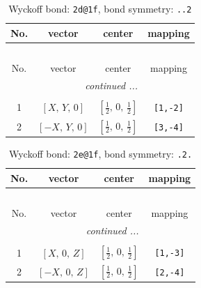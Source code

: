 \documentclass[fleqn,8pt]{jsarticle}
\begin{document}
\begin{longtable}{cccc}
\caption{Wyckoff bond: {\tt 2d@1f}, bond symmetry: {\tt ..2}}
 \\
 \hline \hline
No. & vector & center & mapping \\ \hline \endfirsthead

\multicolumn{3}{l}{\tablename\ \thetable{}} \\
 \hline \hline
No. & vector & center & mapping \\ \hline \endhead

 \hline \hline
\multicolumn{3}{r}{\footnotesize\it continued ...} \\ \endfoot

 \hline \hline
\multicolumn{3}{r}{} \\ \endlastfoot

1 & $\left[ X,\, Y,\, 0 \right]$ & $\left[ \frac{1}{2},\, 0,\, \frac{1}{2} \right]$ & {\tt [1,-2]} \\ \hline
2 & $\left[ - X,\, Y,\, 0 \right]$ & $\left[ \frac{1}{2},\, 0,\, \frac{1}{2} \right]$ & {\tt [3,-4]} \\
\end{longtable}
\renewcommand{\arraystretch}{1.2}
\begin{longtable}{cccc}
\caption{Wyckoff bond: {\tt 2e@1f}, bond symmetry: {\tt .2.}}
 \\
 \hline \hline
No. & vector & center & mapping \\ \hline \endfirsthead

\multicolumn{3}{l}{\tablename\ \thetable{}} \\
 \hline \hline
No. & vector & center & mapping \\ \hline \endhead

 \hline \hline
\multicolumn{3}{r}{\footnotesize\it continued ...} \\ \endfoot

 \hline \hline
\multicolumn{3}{r}{} \\ \endlastfoot

1 & $\left[ X,\, 0,\, Z \right]$ & $\left[ \frac{1}{2},\, 0,\, \frac{1}{2} \right]$ & {\tt [1,-3]} \\ \hline
2 & $\left[ - X,\, 0,\, Z \right]$ & $\left[ \frac{1}{2},\, 0,\, \frac{1}{2} \right]$ & {\tt [2,-4]} \\
\end{longtable}
\renewcommand{\arraystretch}{1.2}
\end{document}
